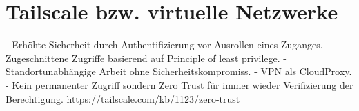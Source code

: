 \section{Tailscale bzw. virtuelle Netzwerke}

- Erhöhte Sicherheit durch Authentifizierung vor Ausrollen eines Zuganges.
- Zugeschnittene Zugriffe basierend auf Principle of least privilege.
- Standortunabhängige Arbeit ohne Sicherheitskompromiss.
- VPN als CloudProxy.
- Kein permanenter Zugriff sondern Zero Trust für immer wieder Verifizierung der Berechtigung. https://tailscale.com/kb/1123/zero-trust
